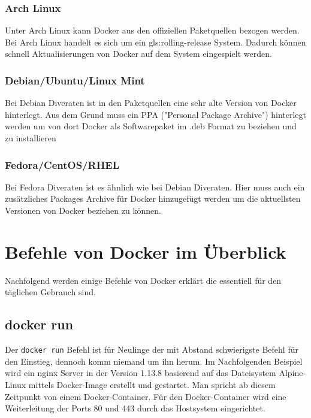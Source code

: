 \subsubsection{Arch Linux}%
\label{sec:docker.installation.arch-linux}
Unter Arch Linux kann Docker aus den offiziellen Paketquellen bezogen werden. Bei Arch Linux handelt es sich um ein \Gls{gls:rolling-release} System. Dadurch können schnell Aktualisierungen von Docker auf dem System eingespielt werden.


\subsubsection{Debian/Ubuntu/Linux Mint}%
\label{sec:docker.installation.debian}
Bei Debian Diveraten ist in den Paketquellen eine sehr alte Version von Docker hinterlegt. Aus dem Grund muss ein PPA ("Personal Package Archive") hinterlegt werden um von dort Docker als Softwarepaket im .deb Format zu beziehen und zu installieren


\subsubsection{Fedora/CentOS/RHEL}%
\label{sec:docker.installation.fedora}
Bei Fedora Diveraten ist es ähnlich wie bei Debian Diveraten. Hier muss auch ein zusätzliches Packages Archive für Docker hinzugefügt werden um die aktuellsten Versionen von Docker beziehen zu können.



\section{Befehle von Docker im Überblick}%
\label{sec:docker-befehle}
Nachfolgend werden einige Befehle von Docker erklärt die essentiell für den täglichen Gebrauch sind.

\subsection{docker run}%
\label{sec:docker-befehle.run}
Der \texttt{docker run} Befehl ist für Neulinge der mit Abstand schwierigste Befehl für den Einstieg, dennoch komm niemand um ihn herum. Im Nachfolgenden Beispiel wird ein nginx Server in der Version 1.13.8 basierend auf das Dateisystem Alpine-Linux mittels Docker-Image erstellt und gestartet. Man spricht ab diesem Zeitpunkt von einem Docker-Container. Für den Docker-Container wird eine Weiterleitung der Ports 80 und 443 durch das Hostsystem eingerichtet.

